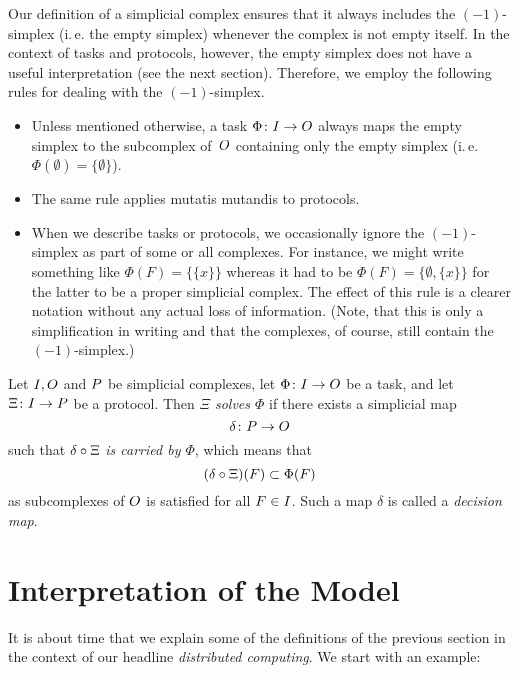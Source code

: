 \begin{thConvention}
    Our definition of a simplicial complex ensures that it always includes the
    $(-1)$-simplex (i.\,e. the empty simplex) whenever the complex is not empty
    itself. In the context of tasks and protocols, however, the empty simplex
    does not have a useful interpretation (see the next section). Therefore, we
    employ the following rules for dealing with the $(-1)$-simplex.
    \begin{itemize}
        \item
            Unless mentioned otherwise, a task $\Phi\colon I\to O$ always
            maps the empty simplex to the subcomplex of~$O$ containing only
            the empty simplex (i.\,e. $\Phi(\emptyset) = \{\emptyset\}$).
            
        \item
            The same rule applies mutatis mutandis to protocols.
            
        \item
            When we describe tasks or protocols, we occasionally ignore the
            $(-1)$-simplex as part of some or all complexes. For instance,
            we might write something like $\Phi(F) = \{\{x\}\}$ whereas
            it had to be $\Phi(F) = \{\emptyset,\{x\}\}$ for the
            latter to be a proper simplicial complex. The effect of
            this rule is a clearer notation without any actual loss
            of information. (Note, that this is only a simplification
            in writing and that the complexes, of course, still contain
            the $(-1)$-simplex.)
    \end{itemize}
\end{thConvention}

\begin{thDef}
    Let $I,O$ and $P$ be simplicial complexes,
    let $\Phi\colon I\to O$ be a task,
    and let $\Xi\colon I\to P$ be a protocol.
    Then \emph{$\Xi$ solves $\Phi$} if there exists a simplicial map
    \[ \delta\colon P\to O \] 
    such that $\delta\after\Xi$ \emph{is carried by $\Phi$},
    which means that
    \[ (\delta\after\Xi)(F) \subset \Phi(F) \]
    as subcomplexes of $O$ is satisfied for all $F\in I$.
    Such a map $\delta$ is called a \emph{decision map}.
\end{thDef}

\section{Interpretation of the Model}
It is about time that we explain some of the definitions of the previous
section in the context of our headline \emph{distributed computing}.
We start with an example:

